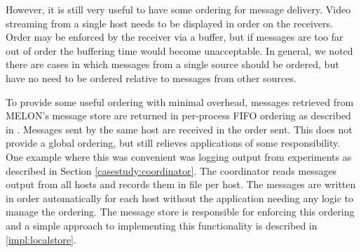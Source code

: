 However, it is still very useful to have some ordering for message delivery. Video streaming from a single host needs to be displayed in order on the receivers. Order may be enforced by the receiver via a buffer, but if messages are too far out of order the buffering time would become unacceptable. In general, we noted there are cases in which messages from a single source should be ordered, but have no need to be ordered relative to messages from other sources.

To provide some useful ordering with minimal overhead, messages retrieved from MELON's message store are returned in per-process FIFO ordering as described in \cite{distbook}. Messages sent by the same host are received in the order sent. This does not provide a global ordering, but still relieves applications of some responsibility. One example where this was convenient was logging output from experiments as described in Section \ref{casestudy:coordinator}. The coordinator reads messages output from all hosts and records them in file per host. The messages are written in order automatically for each host without the application needing any logic to manage the ordering. The message store is responsible for enforcing this ordering and a simple approach to implementing this functionality is described in \ref{impl:localstore}.